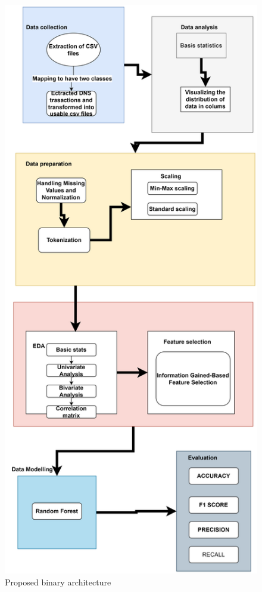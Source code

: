 \begin{figure}[ht!]
    \centering
    \includegraphics[width=0.6\linewidth]{chap3/images/Architecture binary Diagram2.drawio.png}
    \caption{Proposed binary architecture}
    \label{fig:enter-label}
\end{figure}




